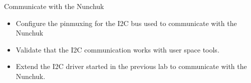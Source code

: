 \setuplabframe
{Communicate with the Nunchuk}
{
  \begin{itemize}
  \item Configure the pinmuxing for the I2C bus used to communicate
    with the Nunchuk
  \item Validate that the I2C communication works with user space
    tools.
  \item Extend the I2C driver started in the previous lab to
    communicate with the Nunchuk.
  \end{itemize}
}

